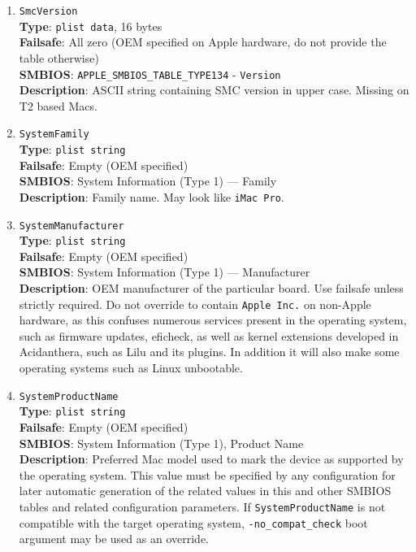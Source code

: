 \documentclass[]{article}
\begin{document}
\begin{enumerate}
  Automatic value generation attempts to provide the most accurate value for
  the currently installed CPU. When this fails, please raise an
  \href{https://github.com/acidanthera/bugtracker/issues}{issue} and
  provide \texttt{sysctl machdep.cpu} and
  \href{https://github.com/acidanthera/dmidecode}{\texttt{dmidecode}} output.
  For a full list of available values and their limitations (the value will
  only apply if the CPU core count matches), refer to the Apple SMBIOS definitions header
  \href{https://github.com/acidanthera/OpenCorePkg/blob/master/Include/Apple/IndustryStandard/AppleSmBios.h}{here}.
\item
  \texttt{SmcVersion}\\
  \textbf{Type}: \texttt{plist\ data}, 16 bytes\\
  \textbf{Failsafe}: All zero (OEM specified on Apple hardware, do not provide the table otherwise)\\
  \textbf{SMBIOS}: \texttt{APPLE\_SMBIOS\_TABLE\_TYPE134} - \texttt{Version}\\
  \textbf{Description}: ASCII string containing SMC version in upper case.
  Missing on T2 based Macs.
\item
  \texttt{SystemFamily}\\
  \textbf{Type}: \texttt{plist\ string}\\
  \textbf{Failsafe}: Empty (OEM specified)\\
  \textbf{SMBIOS}: System Information (Type 1) --- Family\\
  \textbf{Description}: Family name. May look like \texttt{iMac\ Pro}.
\item
  \texttt{SystemManufacturer}\\
  \textbf{Type}: \texttt{plist\ string}\\
  \textbf{Failsafe}: Empty (OEM specified)\\
  \textbf{SMBIOS}: System Information (Type 1) --- Manufacturer\\
  \textbf{Description}: OEM manufacturer of the particular board. Use failsafe
  unless strictly required. Do not override to contain \texttt{Apple\ Inc.}
  on non-Apple hardware, as this confuses numerous services present in
  the operating system, such as firmware updates, eficheck, as well as
  kernel extensions developed in Acidanthera, such as Lilu and its
  plugins. In addition it will also make some operating systems
  such as Linux unbootable.
\item
  \texttt{SystemProductName}\\
  \textbf{Type}: \texttt{plist\ string}\\
  \textbf{Failsafe}: Empty (OEM specified)\\
  \textbf{SMBIOS}: System Information (Type 1), Product Name\\
  \textbf{Description}: Preferred Mac model used to mark the device as
  supported by the operating system. This value must be specified by any
  configuration for later automatic generation of the related values in
  this and other SMBIOS tables and related configuration parameters. If
  \texttt{SystemProductName} is not compatible with the target operating
  system, \texttt{-no\_compat\_check} boot argument may be used as an
  override.


\end{enumerate}
\end{document}
